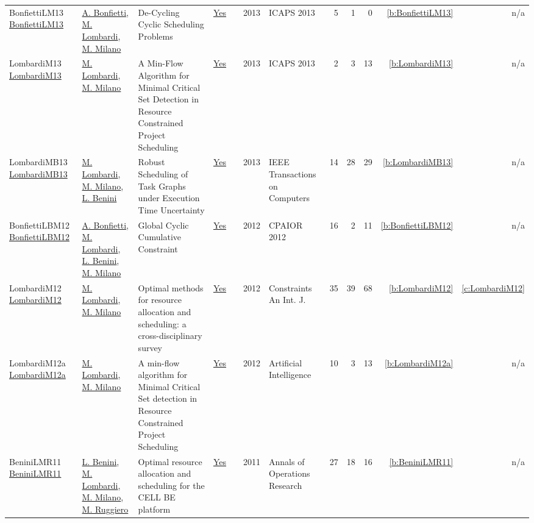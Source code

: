 {\begin{longtable}{>{\raggedright\arraybackslash}p{3cm}>{\raggedright\arraybackslash}p{6cm}>{\raggedright\arraybackslash}p{6.5cm}rrrp{2.5cm}rrrrr}
BonfiettiLM13 \href{http://www.aaai.org/ocs/index.php/ICAPS/ICAPS13/paper/view/6050}{BonfiettiLM13} & \hyperref[auth:a203]{A. Bonfietti}, \hyperref[auth:a143]{M. Lombardi}, \hyperref[auth:a144]{M. Milano} & De-Cycling Cyclic Scheduling Problems & \href{../works/BonfiettiLM13.pdf}{Yes} & \cite{BonfiettiLM13} & 2013 & ICAPS 2013 & 5 & 1 & 0 & \ref{b:BonfiettiLM13} & n/a\\
LombardiM13 \href{http://www.aaai.org/ocs/index.php/ICAPS/ICAPS13/paper/view/6052}{LombardiM13} & \hyperref[auth:a143]{M. Lombardi}, \hyperref[auth:a144]{M. Milano} & A Min-Flow Algorithm for Minimal Critical Set Detection in Resource Constrained Project Scheduling & \href{../works/LombardiM13.pdf}{Yes} & \cite{LombardiM13} & 2013 & ICAPS 2013 & 2 & 3 & 13 & \ref{b:LombardiM13} & n/a\\
LombardiMB13 \href{http://dx.doi.org/10.1109/tc.2011.203}{LombardiMB13} & \hyperref[auth:a143]{M. Lombardi}, \hyperref[auth:a144]{M. Milano}, \hyperref[auth:a247]{L. Benini} & Robust Scheduling of Task Graphs under Execution Time Uncertainty & \href{../works/LombardiMB13.pdf}{Yes} & \cite{LombardiMB13} & 2013 & IEEE Transactions on Computers & 14 & 28 & 29 & \ref{b:LombardiMB13} & n/a\\
BonfiettiLBM12 \href{https://doi.org/10.1007/978-3-642-29828-8_6}{BonfiettiLBM12} & \hyperref[auth:a203]{A. Bonfietti}, \hyperref[auth:a143]{M. Lombardi}, \hyperref[auth:a247]{L. Benini}, \hyperref[auth:a144]{M. Milano} & Global Cyclic Cumulative Constraint & \href{../works/BonfiettiLBM12.pdf}{Yes} & \cite{BonfiettiLBM12} & 2012 & CPAIOR 2012 & 16 & 2 & 11 & \ref{b:BonfiettiLBM12} & n/a\\
LombardiM12 \href{https://doi.org/10.1007/s10601-011-9115-6}{LombardiM12} & \hyperref[auth:a143]{M. Lombardi}, \hyperref[auth:a144]{M. Milano} & Optimal methods for resource allocation and scheduling: a cross-disciplinary survey & \href{../works/LombardiM12.pdf}{Yes} & \cite{LombardiM12} & 2012 & Constraints An Int. J. & 35 & 39 & 68 & \ref{b:LombardiM12} & \ref{c:LombardiM12}\\
LombardiM12a \href{https://doi.org/10.1016/j.artint.2011.12.001}{LombardiM12a} & \hyperref[auth:a143]{M. Lombardi}, \hyperref[auth:a144]{M. Milano} & A min-flow algorithm for Minimal Critical Set detection in Resource Constrained Project Scheduling & \href{../works/LombardiM12a.pdf}{Yes} & \cite{LombardiM12a} & 2012 & Artificial Intelligence & 10 & 3 & 13 & \ref{b:LombardiM12a} & n/a\\
BeniniLMR11 \href{https://doi.org/10.1007/s10479-010-0718-x}{BeniniLMR11} & \hyperref[auth:a247]{L. Benini}, \hyperref[auth:a143]{M. Lombardi}, \hyperref[auth:a144]{M. Milano}, \hyperref[auth:a724]{M. Ruggiero} & Optimal resource allocation and scheduling for the {CELL} {BE} platform & \href{../works/BeniniLMR11.pdf}{Yes} & \cite{BeniniLMR11} & 2011 & Annals of Operations Research & 27 & 18 & 16 & \ref{b:BeniniLMR11} & n/a\\

\end{longtable}}
